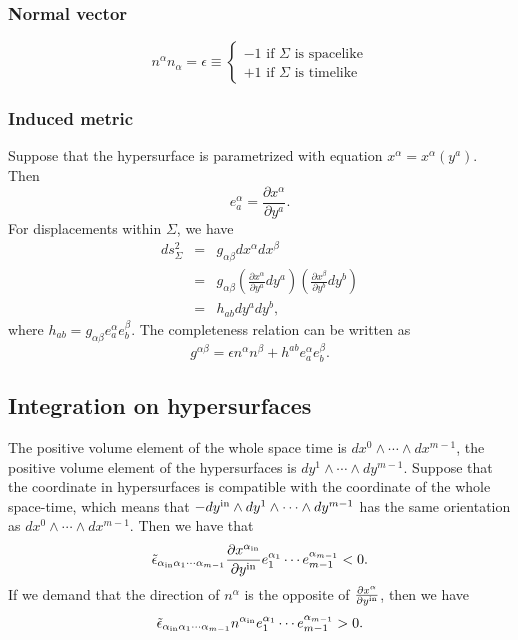 \subsubsection{Normal vector}
\[n^{\alpha}n_{\alpha} = \epsilon \equiv \begin{cases} -1 \mbox{ if  } \Sigma \mbox{ is spacelike}\\ +1 \mbox{ if  } \Sigma \mbox{ is timelike}\end{cases} \]
\subsubsection{Induced metric}
\noindent
Suppose that the hypersurface is parametrized with equation $x^{\alpha} = x^{\alpha}(y^a)$. 
Then
\[e_{a}^{\alpha} = \frac{\partial x^{\alpha}}{\partial y^a}.\]
For displacements within $\Sigma$, we have
\begin{eqnarray}
ds_{\Sigma}^{2} &=& g_{\alpha \beta} dx^{\alpha} dx^{\beta} \nonumber \\
&=& g_{\alpha \beta} (\frac{\partial x^{\alpha}}{\partial y^a} dy^a) (\frac{\partial x^{\beta}}{\partial y^b} dy^b) \nonumber \\
&=& h_{ab} dy^a dy^b, \nonumber
\end{eqnarray}
where $h_{ab} = g_{\alpha \beta} e_{a}^{\alpha} e_{b}^{\beta}$.
The completeness relation can be written as
\[g^{\alpha \beta} = \epsilon n^{\alpha} n^{\beta} + h^{ab}e_{a}^{\alpha} e_{b}^{\beta} .\]

\subsection{Integration on hypersurfaces}
\noindent
The positive volume element of the whole space time is $dx^{0} \wedge \cdots \wedge dx^{m-1}$, the positive volume element of the hypersurfaces is $dy^{1} \wedge \cdots \wedge dy^{m-1}$.
Suppose that the coordinate in hypersurfaces is compatible with the  coordinate of the whole space-time, which means that $-dy^{\rm in} \wedge dy^1 \wedge \cdots \wedge dy^{m-1} $ has the same orientation as $dx^0 \wedge \cdots \wedge dx^{m-1}$. Then we have that
\[\tilde{\epsilon}_{\alpha_{\rm in} \alpha_{1} \cdots \alpha_{m-1}} \frac{\partial x^{\alpha_{\rm in}}}{\partial y^{\rm in}} e_1^{\alpha_1} \cdots e_{m-1}^{\alpha_{m-1}} < 0.\]
If we demand that the direction of $n^{\alpha}$ is the opposite of $\frac{\partial x^{\alpha}}{\partial y^{\rm in}}$, then we have
\[\tilde{\epsilon}_{\alpha_{\rm in} \alpha_{1} \cdots \alpha_{m-1}} n^{\alpha_{\rm in}} e_1^{\alpha_1} \cdots e_{m-1}^{\alpha_{m-1}} > 0.\]

